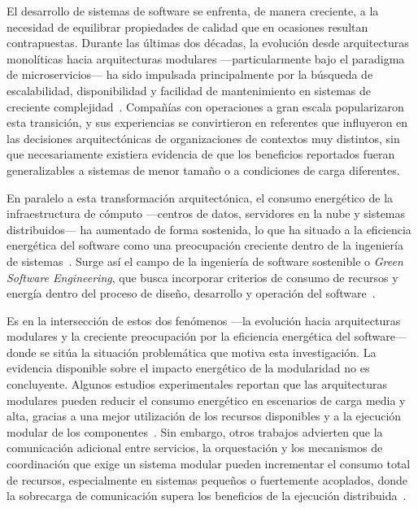 El desarrollo de sistemas de software se enfrenta, de manera creciente, a la necesidad de equilibrar propiedades de calidad que en ocasiones resultan contrapuestas. Durante las últimas dos décadas, la evolución desde arquitecturas monolíticas hacia arquitecturas modulares ---particularmente bajo el paradigma de microservicios--- ha sido impulsada principalmente por la búsqueda de escalabilidad, disponibilidad y facilidad de mantenimiento en sistemas de creciente complejidad~\cite{aldebagy2018comparative}. Compañías con operaciones a gran escala popularizaron esta transición, y sus experiencias se convirtieron en referentes que influyeron en las decisiones arquitectónicas de organizaciones de contextos muy distintos, sin que necesariamente existiera evidencia de que los beneficios reportados fueran generalizables a sistemas de menor tamaño o a condiciones de carga diferentes.

En paralelo a esta transformación arquitectónica, el consumo energético de la infraestructura de cómputo ---centros de datos, servidores en la nube y sistemas distribuidos--- ha aumentado de forma sostenida, lo que ha situado a la eficiencia energética del software como una preocupación creciente dentro de la ingeniería de sistemas~\cite{capra2012green}. Surge así el campo de la ingeniería de software sostenible o \textit{Green Software Engineering}, que busca incorporar criterios de consumo de recursos y energía dentro del proceso de diseño, desarrollo y operación del software~\cite{kern2018sustainable}.

Es en la intersección de estos dos fenómenos ---la evolución hacia arquitecturas modulares y la creciente preocupación por la eficiencia energética del software--- donde se sitúa la situación problemática que motiva esta investigación. La evidencia disponible sobre el impacto energético de la modularidad no es concluyente. Algunos estudios experimentales reportan que las arquitecturas modulares pueden reducir el consumo energético en escenarios de carga media y alta, gracias a una mejor utilización de los recursos disponibles y a la ejecución modular de los componentes~\cite{capuano2026comparative}. Sin embargo, otros trabajos advierten que la comunicación adicional entre servicios, la orquestación y los mecanismos de coordinación que exige un sistema modular pueden incrementar el consumo total de recursos, especialmente en sistemas pequeños o fuertemente acoplados, donde la sobrecarga de comunicación supera los beneficios de la ejecución distribuida~\cite{jagroep2017extending}.

